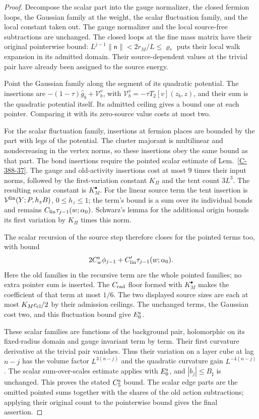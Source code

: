 \documentclass[11pt,letterpaper,reqno]{amsart}
\theoremstyle{definition}
\theoremstyle{remark}
\begin{document}
\begin{proof}
Decompose the scalar part into the gauge normalizer, the closed
fermion loops, the Gaussian family at the weight, the scalar
fluctuation family, and the local constant taken out. The gauge
normalizer and the local source-free subtractions are unchanged.
The closed loops at the fine mass matrix have their original
pointerwise bound: $L^{j-1}\|\mathsf n\|<2r_M/L\le\varrho_*$
puts their local walk expansion in its admitted domain. Their
source-dependent values at the trivial pair have already been
assigned to the source energy.

Point the Gaussian family along the segment of its quadratic
potential. The insertions are
$-(1-\tau)\hat g_b+\mathcal V_b^v$, with
$\mathcal V_b^v=-\tau T_2[v](z_b,z)$, and their sum is the
quadratic potential itself. Its admitted ceiling gives a bound
one at each pointer. Comparing it with its zero-source value
costs at most two.

For the scalar fluctuation family, insertions at fermion places
are bounded by the part with legs of the potential. The cluster
majorant is multilinear and nondecreasing in the vertex norms,
so these insertions obey the same bound as that part. The bond
insertions require the pointed scalar estimate of
Lem.~\ref{C-388-37}. The gauge and old-activity insertions cost
at most $9$ times their input norms, followed by the first-variation
constant $K_\Pi$ and the tent count $3L^3$. The resulting scalar
constant is $K_M^\bullet$. For the linear source term the tent
insertion is $\mathcal V^{\rm lin}(Y;P,h_zB)$, $0\le h_z\le1$;
the term's bound is a sum over its individual bonds and remains
$C_{\rm lin}\tau_{j-1}(w;\alpha_0)$. Schwarz's lemma for the
additional origin bounds its first variation by $K_\Pi$ times
this norm.

The scalar recursion of the source step therefore closes for
the pointed terms too, with bound
\[
 2C_w^{\rm s}\phi_{j-1}
      +C'_{\rm lin}\tau_{j-1}(w;\alpha_0).
\]
Here the old families in the recursive term are the whole
pointed families; no extra pointer sum is inserted. The
$C_{\rm rad}$ floor formed with $K_M^\bullet$ makes the
coefficient of that term at most $1/6$. The two displayed
source sizes are each at most $K_Mc_{\rm cl}/2$ by their
admission ceilings. The unchanged terms, the Gaussian cost
two, and this fluctuation bound give $E_0^{\rm s}$.

These scalar families are functions of the background pair,
holomorphic on its fixed-radius domain and gauge invariant
term by term. Their first curvature derivative at the trivial
pair vanishes. Thus their variation on a layer cube at lag
$n-j$ has the volume factor $L^{3(n-j)}$ and the quadratic
curvature gain $L^{-4(n-j)}$. The scalar sum-over-scales
estimate applies with $E_0^{\rm s}$, and $|b_j|\le B_\sharp$
is unchanged. This proves the stated $C_5^{\rm s}$ bound.
The scalar edge parts are the omitted pointed sums together
with the shares of the old action subtractions; applying their
original count to the pointerwise bound gives the final assertion.
\end{proof}
\end{document}
